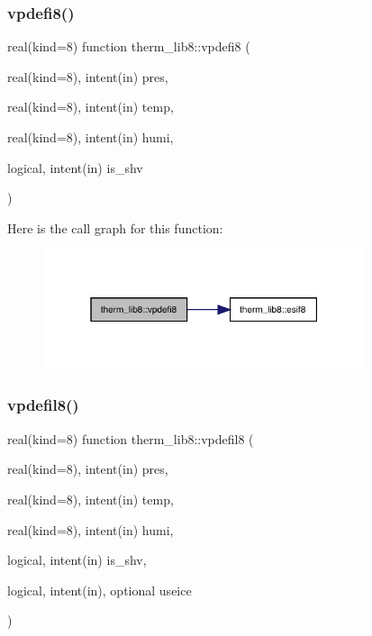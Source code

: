 \subsubsection{\texorpdfstring{vpdefi8()}{vpdefi8()}}
{\footnotesize\ttfamily real(kind=8) function therm\+\_\+lib8\+::vpdefi8 (\begin{DoxyParamCaption}\item[{real(kind=8), intent(in)}]{pres,  }\item[{real(kind=8), intent(in)}]{temp,  }\item[{real(kind=8), intent(in)}]{humi,  }\item[{logical, intent(in)}]{is\+\_\+shv }\end{DoxyParamCaption})}

Here is the call graph for this function\+:
\nopagebreak
\begin{figure}[H]
\begin{center}
\leavevmode
\includegraphics[width=268pt]{namespacetherm__lib8_a1f7ea92fca9ac1740028a6781997e12f_cgraph}
\end{center}
\end{figure}
\mbox{\label{namespacetherm__lib8_a11c93be5459d6b6a5501cbd52977e6ab}} 
\subsubsection{\texorpdfstring{vpdefil8()}{vpdefil8()}}
{\footnotesize\ttfamily real(kind=8) function therm\+\_\+lib8\+::vpdefil8 (\begin{DoxyParamCaption}\item[{real(kind=8), intent(in)}]{pres,  }\item[{real(kind=8), intent(in)}]{temp,  }\item[{real(kind=8), intent(in)}]{humi,  }\item[{logical, intent(in)}]{is\+\_\+shv,  }\item[{logical, intent(in), optional}]{useice }\end{DoxyParamCaption})}

